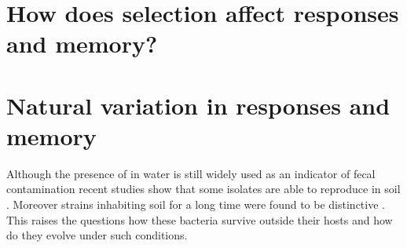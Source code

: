 

\section{How does selection affect responses and memory?}


\section{Natural variation in responses and memory}
Although the presence of  in water is still widely used as an indicator of fecal contamination recent studies show that some  isolates are able to  reproduce in soil \cite{byappanahalli2004indigenous, somorin2016general}.
Moreover strains inhabiting soil for a long time were found to be distinctive \cite{walk2009cryptic, walk2015cryptic}.
This raises the questions how these bacteria survive outside their hosts and how do they evolve under such conditions.


\cleardoublepage

